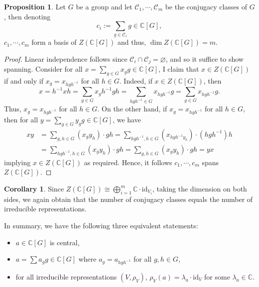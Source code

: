 \documentclass[]{article}
\theoremstyle{definition}
\newtheorem{corollary}{Corollary}[theorem]
\theoremstyle{definition}
\newtheorem{proposition}{Proposition}[section]
\begin{document}
\begin{proposition}
  Let \(G\) be a group and let \(\mathcal{C}_1, \cdots, \mathcal{C}_m\) be the 
  conjugacy classes of \(G\), then denoting 
  \[c_i := \sum_{g \in \mathcal{C}_i} g \in \mathbb{C}[G],\]
  \(c_1, \cdots, c_m\) form a basis of \(Z(\mathbb{C}[G])\)
  and thus, \(\dim Z(\mathbb{C}[G]) = m\).
\end{proposition}
\begin{proof}
  Linear independence follows since \(\mathcal{C}_i \cap \mathcal{C}_j = 
  \varnothing\), and so it suffice to show spanning. Consider for all 
  \(x = \sum_{g \in G} x_g g \in \mathbb{C}[G]\), I claim that 
  \(x \in Z(\mathbb{C}[G])\) if and only if \(x_g = x_{hgh^{-1}}\) for all 
  \(h \in G\). Indeed, if \(x \in Z(\mathbb{C}[G])\), then 
  \[x = h^{-1}xh = \sum_{g \in G} x_g h^{-1}gh = 
    \sum_{hgh^{-1} \in G} x_{hgh^{-1}} g = \sum_{g \in G} x_{hgh^{-1}} g.\]
  Thus, \(x_g = x_{hgh^{-1}}\) for all \(h \in G\). On the other hand, if 
  \(x_g = x_{hgh^{-1}}\) for all \(h \in G\), then for all 
  \(y = \sum_{g \in G} y_g g \in \mathbb{C}[G]\), we have 
  \[\begin{split}
    xy & = \sum_{g, h \in G} (x_g y_h) \cdot gh = 
    \sum_{hgh^{-1}, h \in G} (x_{hgh^{-1} y_h}) \cdot (hgh^{-1})h\\ 
    & = \sum_{hgh^{-1}, h \in G} (x_g y_h) \cdot g h = 
    \sum_{g, h \in G}(x_g y_h) \cdot g h = yx
  \end{split}\]
  implying \(x \in Z(\mathbb{C}[G])\) as required. Hence, it follows 
  \(c_1, \cdots, c_m\) spans \(Z(\mathbb{C}[G])\).
\end{proof}

\begin{corollary}
  Since \(Z(\mathbb{C}[G]) \cong \bigoplus_{i = 1}^m 
  \mathbb{C} \cdot \text{id}_{V_i}\), taking the dimension on both sides, 
  we again obtain that the number of conjugacy classes equals the number of 
  irreducible representations.
\end{corollary}

In summary, we have the following three equivalent statements:
\begin{itemize}
  \item \(a \in \mathbb{C}[G]\) is central,
  \item \(a = \sum a_g g \in \mathbb{C}[G]\) where \(a_g = a_{hgh^{-1}}\) 
    for all \(g, h \in G\),
  \item for all irreducible representations \((V, \rho_V)\), 
    \(\rho_V(a) = \lambda_a \cdot \text{id}_V\) for some \(\lambda_a \in \mathbb{C}\).
\end{itemize}
\end{document}
